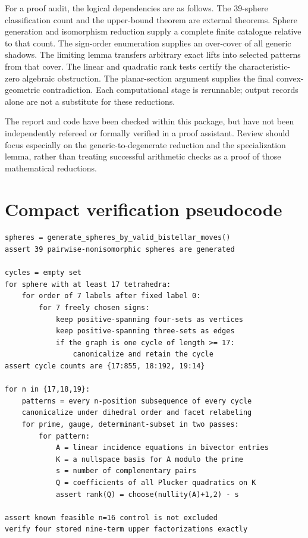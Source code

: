 \documentclass[11pt]{article}
\theoremstyle{definition}
\begin{document}
For a proof audit, the logical dependencies are as follows. The 39-sphere classification count and the upper-bound theorem are external theorems. Sphere generation and isomorphism reduction supply a complete finite catalogue relative to that count. The sign-order enumeration supplies an over-cover of all generic shadows. The limiting lemma transfers arbitrary exact lifts into selected patterns from that cover. The linear and quadratic rank tests certify the characteristic-zero algebraic obstruction. The planar-section argument supplies the final convex-geometric contradiction. Each computational stage is rerunnable; output records alone are not a substitute for these reductions.

The report and code have been checked within this package, but have not been independently refereed or formally verified in a proof assistant. Review should focus especially on the generic-to-degenerate reduction and the specialization lemma, rather than treating successful arithmetic checks as a proof of those mathematical reductions.

\appendix
\section{Compact verification pseudocode}
\begin{verbatim}
spheres = generate_spheres_by_valid_bistellar_moves()
assert 39 pairwise-nonisomorphic spheres are generated

cycles = empty set
for sphere with at least 17 tetrahedra:
    for order of 7 labels after fixed label 0:
        for 7 freely chosen signs:
            keep positive-spanning four-sets as vertices
            keep positive-spanning three-sets as edges
            if the graph is one cycle of length >= 17:
                canonicalize and retain the cycle
assert cycle counts are {17:855, 18:192, 19:14}

for n in {17,18,19}:
    patterns = every n-position subsequence of every cycle
    canonicalize under dihedral order and facet relabeling
    for prime, gauge, determinant-subset in two passes:
        for pattern:
            A = linear incidence equations in bivector entries
            K = a nullspace basis for A modulo the prime
            s = number of complementary pairs
            Q = coefficients of all Plucker quadratics on K
            assert rank(Q) = choose(nullity(A)+1,2) - s

assert known feasible n=16 control is not excluded
verify four stored nine-term upper factorizations exactly
\end{verbatim}
\end{document}
